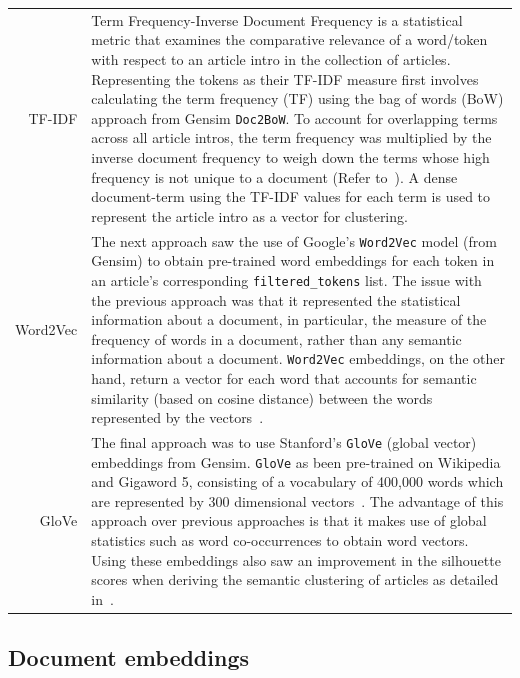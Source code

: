 \renewcommand\arraystretch{2}
\captionsetup{singlelinecheck=false, labelfont=sc, labelsep=quad}
\begin{longtable}{@{\,}r <{\hskip 2pt} !{\foo} >{\arraybackslash}p{14cm}}
\centering

TF-IDF & Term Frequency-Inverse Document Frequency is a statistical metric that examines the comparative relevance of a word/token with respect to an article intro in the collection of articles. Representing the tokens as their TF-IDF measure first involves calculating the term frequency (TF) using the bag of words (BoW) approach from Gensim \texttt{Doc2BoW}. To account for overlapping terms across all article intros, the term frequency was multiplied by the inverse document frequency to weigh down the terms whose high frequency is not unique to a document (Refer to~). A dense document-term using the TF-IDF values for each term is used to represent the article intro as a vector for clustering. \\

Word2Vec & The next approach saw the use of Google's \texttt{Word2Vec} model (from Gensim) to obtain pre-trained word embeddings for each token in an article's corresponding \texttt{filtered\_tokens} list. The issue with the previous approach was that it represented the statistical information about a document, in particular, the measure of the frequency of words in a document, rather than any semantic information about a document. \texttt{Word2Vec} embeddings, on the other hand, return a vector for each word that accounts for semantic similarity (based on cosine distance) between the words represented by the vectors~\cite{word2vec}. \\

GloVe & The final approach was to use Stanford's \texttt{GloVe} (global vector) embeddings from Gensim. \texttt{GloVe} as been pre-trained on Wikipedia and Gigaword 5, consisting of a vocabulary of 400,000 words which are represented by 300 dimensional vectors~\cite{glove}. The advantage of this approach over previous approaches is that it makes use of global statistics such as word co-occurrences to obtain word vectors. Using these embeddings also saw an improvement in the silhouette scores when deriving the semantic clustering of articles as detailed in~. \\
\end{longtable}

\newpage
\subsection{Document embeddings}


